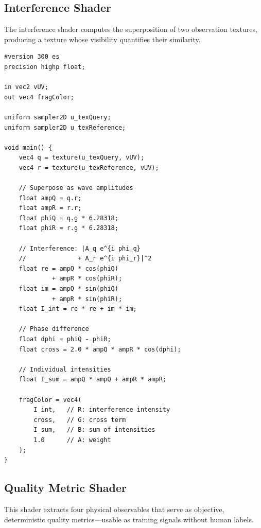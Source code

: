 \documentclass[11pt,twocolumn,a4paper]{article}
\begin{document}
\subsection{Interference Shader}

The interference shader computes the superposition of two observation
textures, producing a texture whose visibility quantifies their
similarity.

\begin{lstlisting}[style=glsl,caption={SBS Universal Interference Shader.}]
#version 300 es
precision highp float;

in vec2 vUV;
out vec4 fragColor;

uniform sampler2D u_texQuery;
uniform sampler2D u_texReference;

void main() {
    vec4 q = texture(u_texQuery, vUV);
    vec4 r = texture(u_texReference, vUV);

    // Superpose as wave amplitudes
    float ampQ = q.r;
    float ampR = r.r;
    float phiQ = q.g * 6.28318;
    float phiR = r.g * 6.28318;

    // Interference: |A_q e^{i phi_q}
    //              + A_r e^{i phi_r}|^2
    float re = ampQ * cos(phiQ)
             + ampR * cos(phiR);
    float im = ampQ * sin(phiQ)
             + ampR * sin(phiR);
    float I_int = re * re + im * im;

    // Phase difference
    float dphi = phiQ - phiR;
    float cross = 2.0 * ampQ * ampR * cos(dphi);

    // Individual intensities
    float I_sum = ampQ * ampQ + ampR * ampR;

    fragColor = vec4(
        I_int,   // R: interference intensity
        cross,   // G: cross term
        I_sum,   // B: sum of intensities
        1.0      // A: weight
    );
}
\end{lstlisting}

\subsection{Quality Metric Shader}

This shader extracts four physical observables that serve as
objective, deterministic quality metrics---usable as training signals
without human labels.
\end{document}
